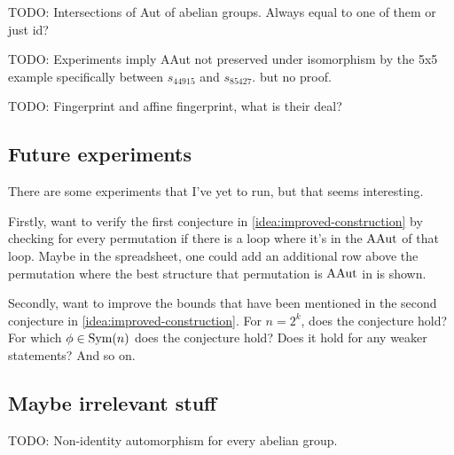 \begin{idea}
    TODO: Intersections of Aut of abelian groups. Always equal to one of them or just id?

\end{idea}

\begin{idea}
    TODO: Experiments imply AAut not preserved under isomorphism by the 5x5 example specifically between \( s_{44915} \) and \( s_{85427} \). but no proof.
\end{idea}

\begin{idea}
    TODO: Fingerprint and affine fingerprint, what is their deal?
\end{idea}

\subsection{Future experiments}

There are some experiments that I've yet to run, but that seems interesting.

\begin{idea}
    Firstly, want to verify the first conjecture in \autoref{idea:improved-construction} by checking for every permutation if there is a loop where it's in the \( \operatorname{AAut} \) of that loop. Maybe in the spreadsheet, one could add an additional row above the permutation where the best structure that permutation is \( \operatorname{AAut} \) in is shown.
\end{idea}

\begin{idea}
    Secondly, want to improve the bounds that have been mentioned in the second conjecture in \autoref{idea:improved-construction}. For \( n = 2^k \), does the conjecture hold? For which \( \phi \in \operatorname{Sym}(n) \) does the conjecture hold? Does it hold for any weaker statements? And so on.
\end{idea}

\subsection{Maybe irrelevant stuff}

\begin{idea}
    TODO: Non-identity automorphism for every abelian group.
\end{idea}
